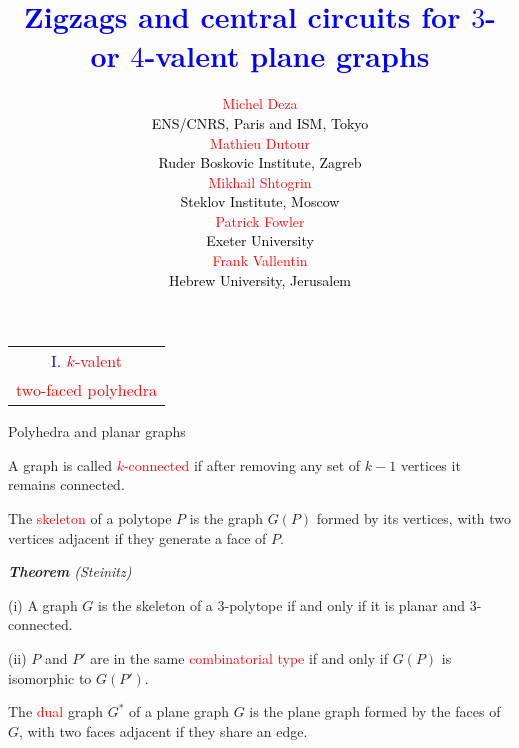 \documentclass[%
pdf,
colorBG,
slideColor,
]{prosper}
\title{\Huge \textcolor{blue}{Zigzags and central circuits for $3$- or $4$-valent plane graphs}}
\author{
\begin{multicols}{2}
\textcolor{red}{\Large Michel Deza}\\[2mm]
\textcolor{black}{\large ENS/CNRS, Paris and ISM, Tokyo}\\[2mm]
\textcolor{red}{\Large Mathieu Dutour}\\[2mm]
\textcolor{black}{\large Ruder Boskovic Institute, Zagreb}\\[2mm]
\textcolor{red}{\Large Mikhail Shtogrin}\\[2mm]
\textcolor{black}{\large Steklov Institute, Moscow}\\[2mm]
\textcolor{red}{\Large Patrick Fowler}\\[2mm]
\textcolor{black}{\large Exeter University}
\end{multicols}
\begin{center}
\textcolor{red}{\Large Frank Vallentin}\\[2mm]
\textcolor{black}{\large Hebrew University, Jerusalem}
\end{center}


}
\date{}
\begin{document}
\maketitle




\begin{slide}{}
\begin{center}
{\Huge 
\begin{tabular*}{9cm}{c}
\\[-0.5cm]
\textcolor{blue}{I. }\textcolor{red}{$k$-valent}\\
\textcolor{red}{two-faced polyhedra}
\end{tabular*}
}
\end{center}
\end{slide}




\begin{slide}{Polyhedra and planar graphs}
\vspace{-2mm}

A graph is called \textcolor{red}{$k$-connected} if after removing any set of $k-1$ vertices it remains connected.

\vspace{2mm}

The \textcolor{red}{skeleton} of a polytope $P$ is the graph $G(P)$ formed by its vertices, with two vertices adjacent if they generate a face of $P$.
%

{\em {\bf Theorem} (Steinitz)

(i) A graph $G$ is the skeleton of a $3$-polytope if and only if it is planar and $3$-connected.

(ii) $P$ and $P'$ are in the same \textcolor{red}{combinatorial type} if and only if $G(P)$ is isomorphic to $G(P')$.
}

\vspace{3mm}

The \textcolor{red}{dual} graph $G^*$ of a plane graph $G$ is the plane graph formed by the faces of $G$, with two faces adjacent if they share an edge.




\end{slide}
\end{document}
